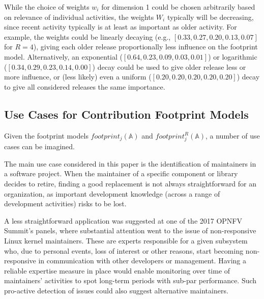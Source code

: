 While the choice of weights $w_i$ for dimension 1 could be chosen arbitrarily based on relevance of individual activities, the weights $W_i$ typically will be decreasing, since recent activity typically is at least as important as older activity. For example, the weights could be linearly decaying (e.g., $[0.33,0.27,0.20,0.13,0.07]$ for $R=4$), giving each older release proportionally less influence on the footprint model. Alternatively, an exponential ($[0.64,0.23,0.09,0.03,0.01]$) or logarithmic ($[0.34,0.29,0.23,0.14,0.00]$) decay could be used to give older release less or more influence, or (less likely) even a uniform ($[0.20,0.20,0.20,0.20,0.20]$) decay to give all considered releases the same importance.%


\subsection{Use Cases for Contribution Footprint Models}
\label{sec:expertise-formula}

Given the footprint models $footprint_j(\mathbb{A})$ and $footprint_j^R(\mathbb{A})$, a number of use cases can be imagined.

The main use case considered in this paper is the identification of maintainers in a software project. When the maintainer of a specific component or library decides to retire, finding a good replacement is not always straightforward for an organization, as important development knowledge (across a range of development activities) risks to be lost.

A less straightforward application was suggested at one of the 2017 OPNFV Summit's panels, where substantial attention went to the issue of non-responsive Linux kernel maintainers. These are experts responsible for a given subsystem who, due to personal events, loss of interest or other reasons, start becoming non-responsive in communication with other developers or management. Having a reliable expertise measure in place would enable monitoring over time of maintainers' activities to spot long-term periods with sub-par performance. Such pro-active detection of issues could also suggest alternative maintainers.

